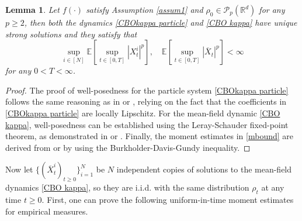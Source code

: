 \documentclass[12pt]{amsart}
\newcommand{\RR}{{\mathbb R}}
\newcommand{\EE}{{\mathbb E}}
\newcommand{\OX}{{\overline{X}}}
\numberwithin{equation}{section}
\newtheorem{lemma}[theorem]{Lemma}
\begin{document}
\begin{lemma}\label{thmexist}  
	Let $f(\cdot)$ satisfy Assumption \ref{assum1} and $\rho_0\in\mathscr{P}_{p}(\RR^d)$ for any $p\geq 2$, then both the dynamics \eqref{CBOkappa particle} and \eqref{CBO kappa} have unique strong solutions and they satisfy that
	\begin{equation}\label{mbound}
		\sup_{i\in[N]}\EE\left[\sup_{t\in[0,T]}|X_t^i|^{p}\right],\quad \EE\left[\sup_{t\in[0,T]} |\OX_t|^{p}\right]<\infty
	\end{equation}
	for any $0<T<\infty$. %
\end{lemma} 
\begin{proof}
The proof of well-posedness for the particle system \eqref{CBOkappa particle} follows the same reasoning as in \cite[Theorem 2.1]{carrillo2018analytical} or \cite[Theorem 2.2]{gerber2023mean}, relying on the fact that the coefficients in \eqref{CBOkappa particle} are locally Lipschitz. For the mean-field dynamic \eqref{CBO kappa}, well-posedness can be established using the Leray-Schauder fixed-point theorem, as demonstrated in \cite[Theorem 3.1]{carrillo2018analytical} or \cite[Theorem 2.2]{gerber2023mean}. Finally, the moment estimates in \eqref{mbound} are derived from \cite[Lemma 3.4]{carrillo2018analytical} or \cite[Lemma 3.5]{gerber2023mean} by using the Burkholder-Davis-Gundy inequality.
\end{proof}

Now let $\{(\OX_t^i)_{t\geq 0}\}_{i=1}^N$ be $N$ independent copies of solutions to the mean-field dynamics \eqref{CBO kappa}, so they are i.i.d. with the same  distribution $\rho_t$ at any time $t\geq 0$. First, one can prove the following uniform-in-time moment estimates for empirical measures.
\end{document}
